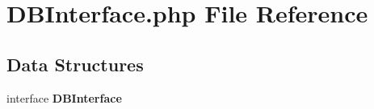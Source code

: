 \section{D\+B\+Interface.\+php File Reference}
\label{_d_b_interface_8php}
\subsection*{Data Structures}
\begin{DoxyCompactItemize}
\item 
interface {\bf D\+B\+Interface}
\end{DoxyCompactItemize}
